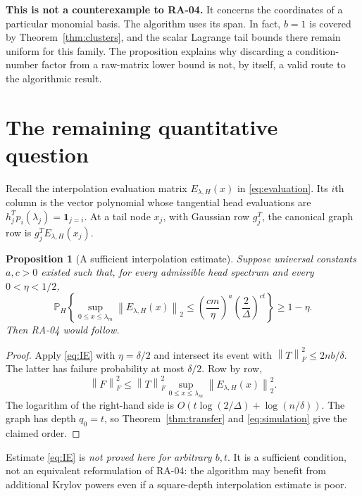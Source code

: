\documentclass[11pt]{article}
\newtheorem{proposition}[theorem]{Proposition}
\theoremstyle{definition}
\newcommand{\Prob}{\mathbb P}
\newcommand{\norm}[1]{\left\lVert #1\right\rVert}
\begin{document}
\textbf{This is not a counterexample to RA-04.}
It concerns the coordinates of a particular monomial basis. The algorithm
uses its span. In fact, $b=1$ is covered by
Theorem~\ref{thm:clusters}, and the scalar Lagrange tail bounds there remain
uniform for this family. The proposition explains why discarding a
condition-number factor from a raw-matrix lower bound is not, by itself,
a valid route to the algorithmic result.

\section{The remaining quantitative question}
\label{sec:remaining}

Recall the interpolation evaluation matrix $E_{\lambda,H}(x)$ in
\eqref{eq:evaluation}.
Its $i$th column is the vector polynomial whose tangential head evaluations
are $h_j^Tp_i(\lambda_j)=\mathbf1_{j=i}$.
At a tail node $x_j$, with Gaussian row $g_j^T$, the canonical graph row is
$g_j^TE_{\lambda,H}(x_j)$.

\begin{proposition}[A sufficient interpolation estimate]
\label{prop:conditional}
Suppose universal constants $a,c>0$ existed such that, for every admissible
head spectrum and every $0<\eta<1/2$,
\begin{equation}
 \Prob_H\left\{
 \sup_{0\leq x\leq\lambda_m}\norm{E_{\lambda,H}(x)}_2
 \leq\left(\frac{cm}{\eta}\right)^a
                 \left(\frac2\Delta\right)^{ct}
 \right\}\geq1-\eta.
 \tag{IE}\label{eq:IE}
\end{equation}
Then RA-04 would follow.
\end{proposition}
\begin{proof}
Apply \eqref{eq:IE} with $\eta=\delta/2$ and intersect its event with
$\norm{T}_F^2\leq2nb/\delta$. The latter has failure probability at most
$\delta/2$. Row by row,
\[
 \norm{F}_F^2
 \leq\norm{T}_F^2\sup_{0\leq x\leq\lambda_m}
                              \norm{E_{\lambda,H}(x)}_2^2.
\]
The logarithm of the right-hand side is
$O(t\log(2/\Delta)+\log(n/\delta))$. The graph has depth $q_0=t$, so
Theorem~\ref{thm:transfer} and \eqref{eq:simulation} give the claimed order.
\end{proof}

Estimate \eqref{eq:IE} is \emph{not proved here for arbitrary $b,t$}.
It is a sufficient condition, not an equivalent reformulation of RA-04:
the algorithm may benefit from additional Krylov powers even if a
square-depth interpolation estimate is poor.
\end{document}
